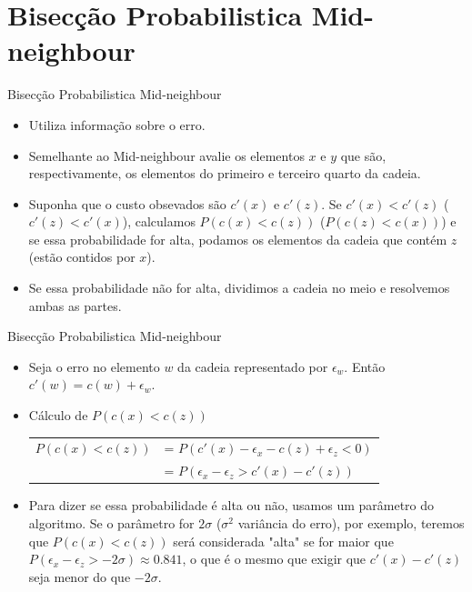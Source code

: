 \documentclass{beamer}
\begin{document}
\section{Bisecção Probabilistica Mid-neighbour}
\begin{frame}{Bisecção Probabilistica Mid-neighbour}
    \begin{itemize}
        \item{Utiliza informação sobre o erro.}
        \item{Semelhante ao Mid-neighbour avalie os elementos $x$ e $y$
            que são, respectivamente, os elementos do primeiro e 
            terceiro quarto da cadeia.}
        \item{Suponha que o custo obsevados são $c' (x)$ e $c' (z)$.
            Se $c' (x) < c'(z)$ ($c'(z) < c' (x)$), calculamos 
            $P (c (x) < c (z))$ ($P (c (z) < c (x))$) e se essa 
            probabilidade for alta, podamos os elementos da cadeia que
            contém $z$ (estão contidos por $x$)}.
        \item{Se essa probabilidade não for alta, dividimos a cadeia no meio
            e resolvemos ambas as partes.}
    \end{itemize}
\end{frame}
\begin{frame}{Bisecção Probabilistica Mid-neighbour}
    \begin{itemize}
        \item{Seja o erro no elemento $w$ da cadeia representado por
            $\epsilon_w.$ Então $c' (w) = c (w) + \epsilon_w$.}
        \item{Cálculo de $P (c (x) < c (z))$}
        \begin{center}
        \begin{tabular}{r l}
            $P (c (x) < c (z)) $ &= $P (c' (x) - 
                \epsilon_x - c (z) + \epsilon_z < 0)$ \\
                &= $P (\epsilon_x - \epsilon_z > c' (x) - c' (z))$ 
        \end{tabular}
        \end{center}
        \item{Para dizer se essa probabilidade é alta ou não, usamos
            um parâmetro do algoritmo. Se o parâmetro for $2\sigma$
            ($\sigma^2$ variância do erro), por exemplo, teremos que
            $P (c (x) < c (z))$ será considerada "alta" se for maior
            que $P (\epsilon_x - \epsilon_z > -2\sigma) \approx 
            0.841$, o que é o mesmo que exigir que $c' (x) - c' (z)$ 
            seja menor do que $-2\sigma$.}
    \end{itemize}
\end{frame}
\end{document}
